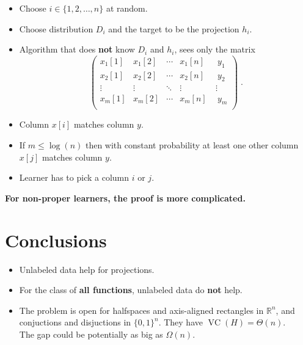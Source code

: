 \documentclass[30pt,landscape]{sciposter}
\newcommand{\R}{\mathbb{R}}
\DeclareMathOperator{\VC}{VC}
\begin{document}
\begin{multicols}{3}
\begin{itemize}
\item Choose $i \in \{1,2,\dots,n\}$ at random.

\item Choose distribution $D_i$ and the target to be the projection $h_i$.

\item Algorithm that does \textbf{not} know $D_i$ and $h_i$, sees only the matrix
$$
\left(
\begin{array}{cccc|c}
x_{1}[1] & x_{1}[2] & \cdots & x_{1}[n] \  & \ y_1 \\
x_{2}[1] & x_{2}[2] & \cdots & x_{2}[n] \ & \ y_2 \\
\vdots & \vdots & \ddots & \vdots \ & \vdots \\
x_{m}[1] & x_{m}[2] & \cdots & x_{m}[n] \ & \ y_m \\
\end{array}
\right) \; .
$$

\item Column $x[i]$ matches column $y$.

\item If $m \le \log(n)$ then with constant probability at least one other column $x[j]$
matches column $y$.

\item Learner has to pick a column $i$ or $j$.
\end{itemize}

\vspace{1cm}

\textbf{For non-proper learners, the proof is more complicated.}

\section*{Conclusions}

\begin{itemize}
\item Unlabeled data help for projections.
\item For the class of \textbf{all functions}, unlabeled data do \textbf{not} help.
\item The problem is open for halfspaces and axis-aligned rectangles in $\R^n$,
and conjuctions and disjuctions in $\{0,1\}^n$. They have $\VC(H) = \Theta(n)$. \\
The gap could be potentially as big as $\Omega(n)$.
\end{itemize}


\nocite{Benedek-Itai-1991,Ben-David-Lu-Pal-2008,Darnstadt-Simon-Szorenyi-2013,Hanneke-2016}




\end{multicols}
\end{document}
